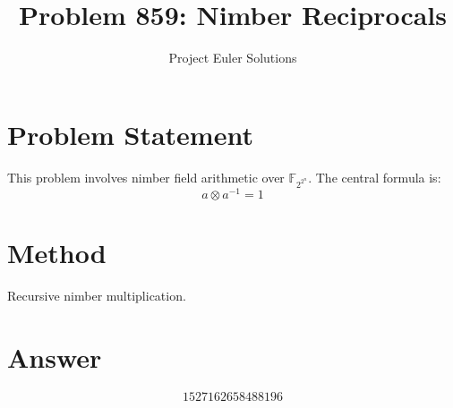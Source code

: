 \documentclass[11pt]{article}
\title{Problem 859: Nimber Reciprocals}
\author{Project Euler Solutions}
\date{}
\begin{document}
\maketitle
\section{Problem Statement}
This problem involves nimber field arithmetic over $\mathbb{F}_{2^{2^n}}$. The central formula is:
\[
a \otimes a^{-1} = 1
\]
\section{Method}
Recursive nimber multiplication.
\section{Answer}

\[
\boxed{1527162658488196}
\]
\end{document}
